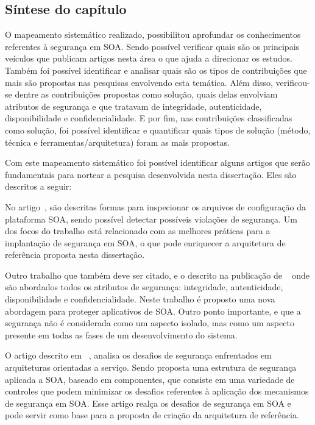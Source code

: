 
\subsection{Síntese do capítulo}

O mapeamento sistemático realizado, possibilitou aprofundar os conhecimentos referentes à segurança em SOA. Sendo possível verificar quais são os principais veículos que publicam artigos nesta área o que ajuda a direcionar os estudos. Também foi possível identificar e analisar quais são os tipos de contribuições que mais são propostas nas pesquisas envolvendo esta temática. Além disso, verificou-se dentre as contribuições propostas como solução, quais delas envolviam atributos de segurança e que tratavam de integridade, autenticidade, disponibilidade e confidencialidade. E por fim, nas contribuições classificadas como solução, foi possível identificar e quantificar quais tipos de solução (método, técnica e ferramentas/arquitetura) foram as mais propostas.

Com este mapeamento sistemático foi possível identificar alguns artigos que serão fundamentais para nortear a pesquisa desenvolvida nesta dissertação. Eles são descritos a seguir:

No artigo~\cite{ WeberAM07},  são descritas formas para inspecionar os arquivos de configuração da plataforma SOA, sendo possível detectar possíveis violações de segurança. Um dos focos do trabalho está relacionado com as melhores práticas para a implantação de segurança em SOA, o que pode enriquecer a arquitetura de referência proposta nesta dissertação.

Outro trabalho que também deve ser citado, e o descrito na publicação de ~\cite{pattern-driven2008} onde são abordados todos os atributos de segurança: integridade, autenticidade, disponibilidade e confidencialidade. Neste trabalho é proposto uma nova abordagem para proteger aplicativos de SOA. Outro ponto importante, e que a segurança não é considerada como um aspecto isolado, mas como um aspecto presente em todas as fases de um desenvolvimento do sistema.

O artigo descrito em ~\cite{Coetzee2012}, analisa os desafios de segurança enfrentados em arquiteturas orientadas a serviço. Sendo proposta uma estrutura de segurança aplicada a SOA, baseado em componentes, que consiste em uma variedade de controles que podem minimizar os desafios referentes à aplicação dos mecanismos de segurança em SOA. Esse artigo realça os desafios de segurança em SOA e pode servir como base para a proposta de criação da arquitetura de referência. 